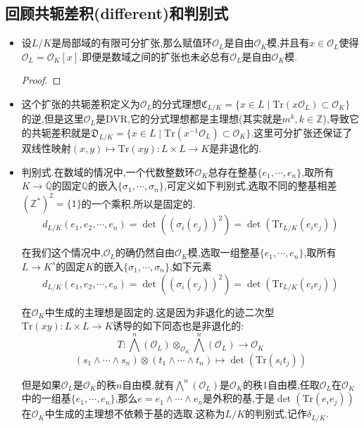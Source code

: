 \subsection{回顾共轭差积(different)和判别式}
\begin{itemize}
	\item 设$L/K$是局部域的有限可分扩张,那么赋值环$\mathscr{O}_L$是自由$\mathscr{O}_K$模,并且有$x\in\mathscr{O}_L$使得$\mathscr{O}_L=\mathscr{O}_K[x]$.即便是数域之间的扩张也未必总有$\mathscr{O}_L$是自由$\mathscr{O}_K$模.
	\begin{proof}
		
		
	\end{proof}
	\item 这个扩张的共轭差积定义为$\mathscr{O}_L$的分式理想$\mathfrak{C}_{L/K}=\{x\in L\mid\mathrm{Tr}(x\mathscr{O}_L)\subset\mathscr{O}_K\}$的逆,但是这里$\mathscr{O}_L$是DVR,它的分式理想都是主理想(其实就是$m^k,k\in\mathbb{Z}$),导致它的共轭差积就是$\mathfrak{D}_{L/K}=\{x\in L\mid\mathrm{Tr}(x^{-1}\mathscr{O}_L)\subset\mathscr{O}_K\}$.这里可分扩张还保证了双线性映射$(x,y)\mapsto\mathrm{Tr}(xy):L\times L\to K$是非退化的.
	\item 判别式.在数域的情况中,一个代数整数环$\mathscr{O}_K$总存在整基$\{e_1,\cdots,e_n\}$,取所有$K\to\overline{\mathbb{Q}}$的固定$\mathbb{Q}$的嵌入$\{\sigma_1,\cdots,\sigma_n\}$,可定义如下判别式,选取不同的整基相差$(\mathbb{Z}^*)^2=\{1\}$的一个乘积,所以是固定的.
	$$d_{L/K}(e_1,e_2,\cdots,e_n)=\det((\sigma_i(e_j))^2)=\det(\mathrm{Tr}_{L/K}(e_ie_j))$$
	
	在我们这个情况中,$\mathscr{O}_L$的确仍然自由$\mathscr{O}_K$模,选取一组整基$\{e_1,\cdots,e_n\}$,取所有$L\to K^s$的固定$K$的嵌入$\{\sigma_1,\cdots,\sigma_n\}$,如下元素
	$$d_{L/K}(e_1,e_2,\cdots,e_n)=\det((\sigma_i(e_j))^2)=\det(\mathrm{Tr}_{L/K}(e_ie_j))$$
	
	在$\mathscr{O}_K$中生成的主理想是固定的.这是因为非退化的迹二次型$\mathrm{Tr}(xy):L\times L\to K$诱导的如下同态也是非退化的:
	$$T:\bigwedge^n(\mathscr{O}_L)\otimes_{\mathscr{O}_K}\bigwedge^n(\mathscr{O}_L)\to\mathscr{O}_K$$
	$$(s_1\wedge\cdots\wedge s_n)\otimes(t_1\wedge\cdots\wedge t_n)\mapsto\det(\mathrm{Tr}(s_it_j))$$
	
	但是如果$\mathscr{O}_L$是$\mathscr{O}_K$的秩$n$自由模,就有$\bigwedge^n(\mathscr{O}_L)$是$\mathscr{O}_K$的秩1自由模,任取$\mathscr{O}_L$在$\mathscr{O}_K$中的一组基$\{e_1,\cdots,e_n\}$,那么$e=e_1\wedge\cdots\wedge e_n$是外积的基,于是$\det(\mathrm{Tr}(e_ie_j))$在$\mathscr{O}_K$中生成的主理想不依赖于基的选取.这称为$L/K$的判别式,记作$\delta_{L/K}$.
\end{itemize}
